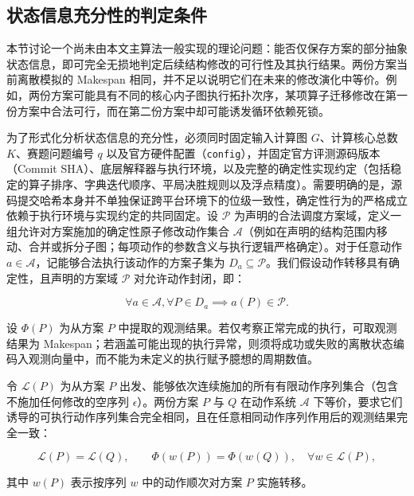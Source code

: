 \documentclass[anonymous,notoc]{gmcm2026}
\begin{document}
\subsection{状态信息充分性的判定条件}

本节讨论一个尚未由本文主算法一般实现的理论问题：能否仅保存方案的部分抽象状态信息，即可完全无损地判定后续结构修改的可行性及其执行结果。两份方案当前离散模拟的 Makespan 相同，并不足以说明它们在未来的修改演化中等价。例如，两份方案可能具有不同的核心内子图执行拓扑次序，某项算子迁移修改在第一份方案中合法可行，而在第二份方案中却可能诱发循环依赖死锁。

为了形式化分析状态信息的充分性，必须同时固定输入计算图 \(G\)、计算核心总数 \(K\)、赛题问题编号 \(q\) 以及官方硬件配置（\texttt{config}），并固定官方评测源码版本（Commit SHA）、底层解释器与执行环境，以及完整的确定性实现约定（包括稳定的算子排序、字典迭代顺序、平局决胜规则以及浮点精度）。需要明确的是，源码提交哈希本身并不单独保证跨平台环境下的位级一致性，确定性行为的严格成立依赖于执行环境与实现约定的共同固定。设 \(\mathcal{P}\) 为声明的合法调度方案域，定义一组允许对方案施加的确定性原子修改动作集合 \(\mathcal{A}\)（例如在声明的结构范围内移动、合并或拆分子图；每项动作的参数含义与执行逻辑严格确定）。对于任意动作 \(a \in \mathcal{A}\)，记能够合法执行该动作的方案子集为 \(D_a \subseteq \mathcal{P}\)。我们假设动作转移具有确定性，且声明的方案域 \(\mathcal{P}\) 对允许动作封闭，即：

\begin{equation}
\forall a \in \mathcal{A}, \forall P \in D_a \implies a(P) \in \mathcal{P}.
\end{equation}

设 \(\Phi(P)\) 为从方案 \(P\) 中提取的观测结果。若仅考察正常完成的执行，可取观测结果为 Makespan；若涵盖可能出现的执行异常，则须将成功或失败的离散状态编码入观测向量中，而不能为未定义的执行赋予臆想的周期数值。

令 \(\mathcal{L}(P)\) 为从方案 \(P\) 出发、能够依次连续施加的所有有限动作序列集合（包含不施加任何修改的空序列 \(\epsilon\)）。两份方案 \(P\) 与 \(Q\) 在动作系统 \(\mathcal{A}\) 下等价，要求它们诱导的可执行动作序列集合完全相同，且在任意相同动作序列作用后的观测结果完全一致：

\begin{equation}
\mathcal{L}(P) = \mathcal{L}(Q), \qquad \Phi(w(P)) = \Phi(w(Q)), \quad \forall w \in \mathcal{L}(P),
\end{equation}

其中 \(w(P)\) 表示按序列 \(w\) 中的动作顺次对方案 \(P\) 实施转移。
\end{document}
